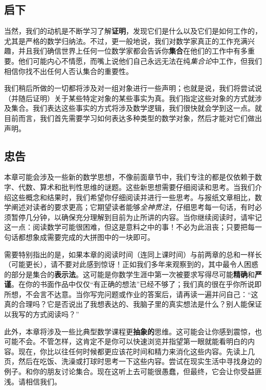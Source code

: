 \subsection{启下}

当然，我们的动机是不断学习了解\textbf{证明}，发现它们是什么以及它们是如何工作的，尤其是严格的数学归纳法。不过，更一般地说，我们对数学家真正的工作充满兴趣，并且我们确信世界上任何一位数学家都会告诉你\textbf{集合}在他们的工作中有多重要。他们可能内心不情愿，而嘴上说他们自己永远无法在纯\emph{集合论}中工作，但我们相信你找不出任何人否认集合的重要性。

我们稍后所做的一切都将涉及对一组对象进行一些声明；也就是说，我们将尝试说（并随后证明）关于某些特定对象的某些事实为真。我们指定这些对象的方式就涉及集合。我们表达这些事实的方式将涉及数学逻辑，我们很快就会学到这一点。就目前而言，我们首先需要学习如何表达多种类型的数学对象，然后才能对它们做出声明。

\subsection{忠告}

本章可能会涉及一些新的数学思想，不像前面章节中，我们专注的都是仅依赖于数字、代数、算术和批判性思维的谜题。这些新思想需要仔细阅读和思考。当我们介绍这些概念和结果时，我们希望你仔细阅读并进行一些思考。与报纸文章相比，数学阐述对读者的要求更高；它期望读者能够\emph{全神贯注}，仔细思考每一句话，有时必须暂停几分钟，以确保充分理解到目前为止所讲的内容。当你继续阅读时，请牢记这一点：阅读数学可能很困难，但这是意料之中的事！不必为此沮丧；只要把每一句话都想象成需要完成的大拼图中的一块即可。

需要特别指出的是，如果本章的阅读时间（连同上课时间）与前两章的总和一样长（可能更长），请不要对此感到惊讶！正如我们多年来观察到的，其中最令人困惑的部分是集合的\textbf{表示法}。这可能是你数学生涯中第一次被要求写得尽可能\textbf{精确}和\textbf{严谨}。在你的书面作品中仅仅``有正确的想法''已经不够了；我们真的很在乎你所说即所想，不会言不达意。当你写完问题或作业的答案后，请再读一遍并问自己：``这真的合理吗？它是否说出了我想表达的、我脑子里的真实想法是什么？别人能保证以我写的方式阅读吗？''

此外，本章将涉及一些比典型数学课程更\textbf{抽象的}思维。这可能会让你感到震惊，也可能不会。不管怎样，这肯定不是你可以快速浏览并指望第一眼就能看明白的内容。现在，你比以往任何时候都更应该花时间和精力来消化这些内容。先读上几页，然后在吃饭、洗澡或打球时思考一下这些内容。尝试在现实生活中寻找身边的例子。和你的朋友讨论集合。现在这听上去可能很愚蠢，但最终，它会让你受益匪浅。请相信我们。